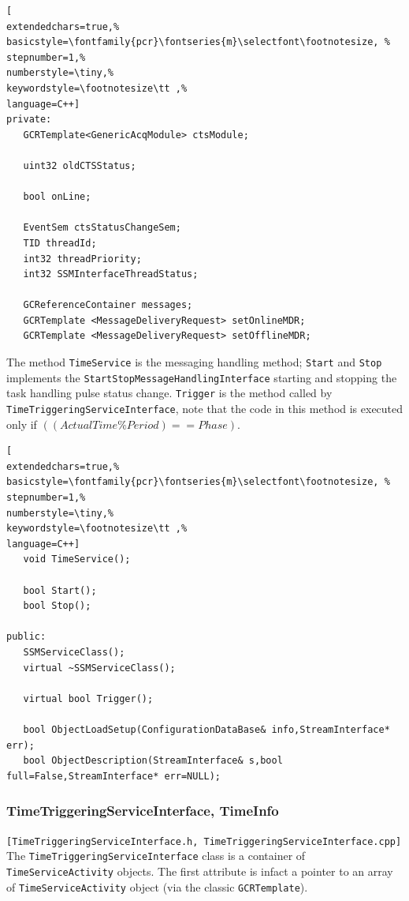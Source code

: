 \begin{lstlisting}[
extendedchars=true,%
basicstyle=\fontfamily{pcr}\fontseries{m}\selectfont\footnotesize, %
stepnumber=1,%
numberstyle=\tiny,%
keywordstyle=\footnotesize\tt ,%
language=C++]
private:
   GCRTemplate<GenericAcqModule> ctsModule;

   uint32 oldCTSStatus;

   bool onLine;

   EventSem ctsStatusChangeSem;
   TID threadId;
   int32 threadPriority;
   int32 SSMInterfaceThreadStatus;

   GCReferenceContainer messages;
   GCRTemplate <MessageDeliveryRequest> setOnlineMDR;
   GCRTemplate <MessageDeliveryRequest> setOfflineMDR;
\end{lstlisting}

The method \texttt{TimeService} is the messaging handling method; \texttt{Start} and \texttt{Stop} implements the \texttt{StartStopMessageHandlingInterface} starting and stopping the task handling pulse status change. \texttt{Trigger} is the method called by \texttt{TimeTriggeringServiceInterface}, note that the code in this method is executed only if $((ActualTime \% Period) == Phase)$.

\begin{lstlisting}[
extendedchars=true,%
basicstyle=\fontfamily{pcr}\fontseries{m}\selectfont\footnotesize, %
stepnumber=1,%
numberstyle=\tiny,%
keywordstyle=\footnotesize\tt ,%
language=C++]
   void TimeService();

   bool Start();
   bool Stop();

public:
   SSMServiceClass();
   virtual ~SSMServiceClass();

   virtual bool Trigger();

   bool ObjectLoadSetup(ConfigurationDataBase& info,StreamInterface* err);
   bool ObjectDescription(StreamInterface& s,bool full=False,StreamInterface* err=NULL);
\end{lstlisting}



\subsubsection{TimeTriggeringServiceInterface, TimeInfo}
\texttt{[TimeTriggeringServiceInterface.h, TimeTriggeringServiceInterface.cpp]} \\
The \texttt{TimeTriggeringServiceInterface} class is a container of \texttt{TimeServiceActivity} objects. The first attribute is infact a pointer to an array of \texttt{TimeServiceActivity} object (via the classic \texttt{GCRTemplate}).

